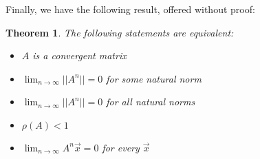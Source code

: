 \documentclass[12pt]{article}
\newcommand{\vecx}{\ensuremath{\vec{x}}}
\newtheorem{theorem}{Theorem}
\begin{document}
Finally, we have the following result, offered without proof:

\begin{theorem}
The following statements are equivalent:
\begin{itemize}
\item[a.] $A$ is a convergent matrix
\item[b.] $\displaystyle{\lim_{n\rightarrow\infty}}||A^n|| = 0$ for some 
          natural norm
\item[c.] $\displaystyle{\lim_{n\rightarrow\infty}}||A^n|| = 0$ for all 
          natural norms
\item[d.] $\rho(A)<1$
\item[e.] $\displaystyle{\lim_{n\rightarrow\infty}}A^n\vecx = 0$ for every
          $\vecx$
\end{itemize}
\end{theorem}
\end{document}
